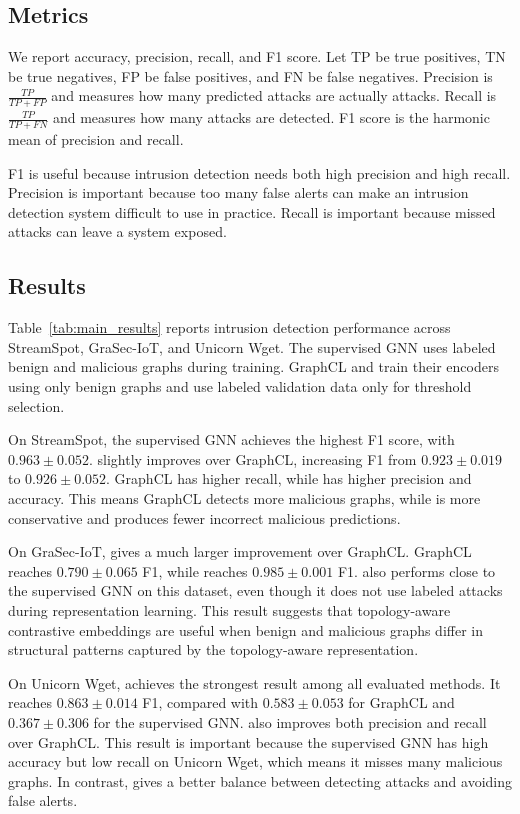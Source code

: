 \subsection{Metrics}

We report accuracy, precision, recall, and F1 score. Let TP be true positives, TN be true negatives, FP be false positives, and FN be false negatives. Precision is $\frac{TP}{TP+FP}$ and measures how many predicted attacks are actually attacks. Recall is $\frac{TP}{TP+FN}$ and measures how many attacks are detected. F1 score is the harmonic mean of precision and recall.

F1 is useful because intrusion detection needs both high precision and high recall. Precision is important because too many false alerts can make an intrusion detection system difficult to use in practice. Recall is important because missed attacks can leave a system exposed.

\subsection{Results}

Table~\ref{tab:main_results} reports intrusion detection performance across StreamSpot, GraSec-IoT, and Unicorn Wget. The supervised GNN uses labeled benign and malicious graphs during training. GraphCL and \sysname{} train their encoders using only benign graphs and use labeled validation data only for threshold selection.

On StreamSpot, the supervised GNN achieves the highest F1 score, with $0.963 \pm 0.052$. \sysname{} slightly improves over GraphCL, increasing F1 from $0.923 \pm 0.019$ to $0.926 \pm 0.052$. GraphCL has higher recall, while \sysname{} has higher precision and accuracy. This means GraphCL detects more malicious graphs, while \sysname{} is more conservative and produces fewer incorrect malicious predictions.

On GraSec-IoT, \sysname{} gives a much larger improvement over GraphCL. GraphCL reaches $0.790 \pm 0.065$ F1, while \sysname{} reaches $0.985 \pm 0.001$ F1. \sysname{} also performs close to the supervised GNN on this dataset, even though it does not use labeled attacks during representation learning. This result suggests that topology-aware contrastive embeddings are useful when benign and malicious graphs differ in structural patterns captured by the topology-aware representation.

On Unicorn Wget, \sysname{} achieves the strongest result among all evaluated methods. It reaches $0.863 \pm 0.014$ F1, compared with $0.583 \pm 0.053$ for GraphCL and $0.367 \pm 0.306$ for the supervised GNN. \sysname{} also improves both precision and recall over GraphCL. This result is important because the supervised GNN has high accuracy but low recall on Unicorn Wget, which means it misses many malicious graphs. In contrast, \sysname{} gives a better balance between detecting attacks and avoiding false alerts.

